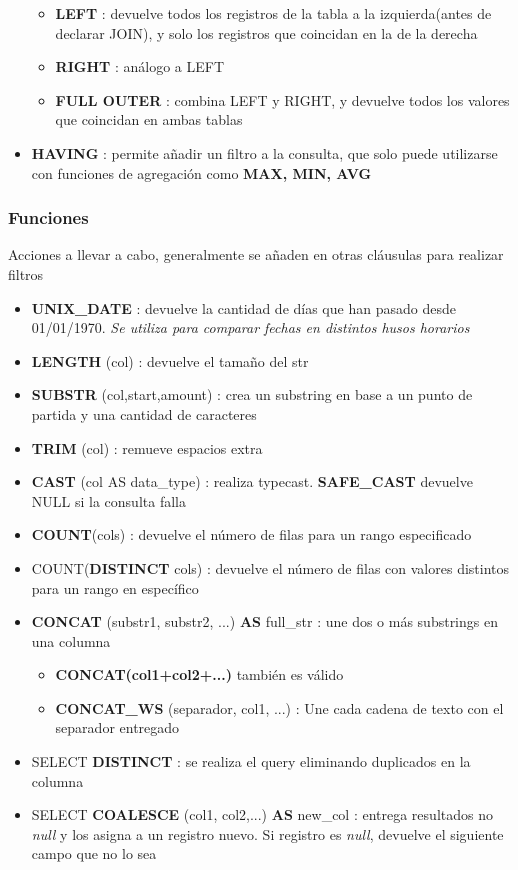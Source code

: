 \begin{itemize}
{\begin{itemize}
        \item {\textbf{LEFT} : devuelve todos los registros de la tabla a la izquierda(antes de declarar JOIN), y solo los registros que coincidan en la de la derecha}
        \item {\textbf{RIGHT} : análogo a LEFT}
        \item {\textbf{FULL OUTER} : combina LEFT y RIGHT, y devuelve todos los valores que coincidan en ambas tablas}    
    \end{itemize}}
    \item {\textbf{HAVING} : permite añadir un filtro a la consulta, que solo puede utilizarse con funciones de agregación como \textbf{MAX, MIN, AVG}}
\end{itemize}

\subsubsection{Funciones}
Acciones a llevar a cabo, generalmente se añaden en otras cláusulas para realizar filtros
\begin{itemize}
    \item {\textbf{UNIX\_DATE} : devuelve la cantidad de días que han pasado desde 01/01/1970. \textit{Se utiliza para comparar fechas en distintos husos horarios}}
    \item {\textbf{LENGTH} (col) : devuelve el tamaño del \gls{str}}
    \item {\textbf{SUBSTR} (col,start,amount) : crea un substring en base a un punto de partida y una cantidad de caracteres}
    \item {\textbf{TRIM} (col) : remueve espacios extra}
    \item {\textbf{CAST} (col AS data\_type) : realiza \gls{typecast}. \textbf{SAFE\_CAST} devuelve NULL si la consulta falla}
    \item {\textbf{COUNT}(cols) : devuelve el número de filas para un rango especificado}
    \item {COUNT(\textbf{DISTINCT} cols) : devuelve el número de filas con valores distintos para un rango en específico}
    \item {\textbf{CONCAT} (substr1, substr2, ...) \textbf{AS} full\_str : une dos o más substrings en una columna
    \begin{itemize}
        \item {\textbf{CONCAT(col1+col2+...)} también es válido}
        \item {\textbf{CONCAT\_WS} (separador, col1, ...) : Une cada cadena de texto con el separador entregado}
    \end{itemize}}
    \item {SELECT \textbf{DISTINCT} : se realiza el query eliminando duplicados en la columna}
    \item {SELECT \textbf{COALESCE} (col1, col2,...) \textbf{AS} new\_col : entrega resultados no \textit{null} y los asigna a un registro nuevo. Si registro es \textit{null}, devuelve el siguiente campo que no lo sea}
    
\end{itemize}


